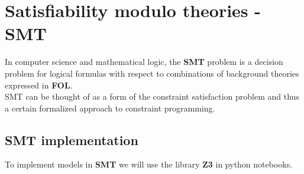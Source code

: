 \section{Satisfiability modulo theories - SMT}
In computer science and mathematical logic, the \textbf{SMT} problem is a decision problem for logical formulas with respect to combinations of background theories expressed in \textbf{FOL}.\\
SMT can be thought of as a form of the constraint satisfaction problem and thus a certain formalized approach to constraint programming. \\

\subsection{SMT implementation}
To implement models in \textbf{SMT} we will use the library \textbf{Z3} in python notebooks.
